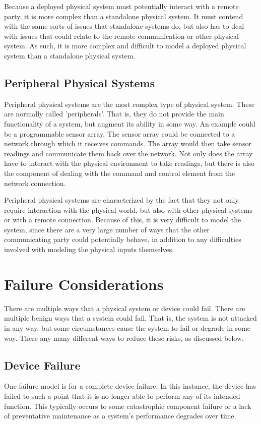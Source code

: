Because a deployed physical system must potentially interact with a remote party, it is more complex than a standalone physical
system. It must contend with the same sorts of issues that standalone systems do, but also has to deal with issues that could
relate to the remote communication or other physical system.  As such, it is more complex and difficult to model a deployed
physical system than a standalone physical system.

\subsection{Peripheral Physical Systems}
Peripheral physical systems are the most complex type of physical system. These are normally called 'peripherals'. That
is, they do not provide the main functionality of a system, but augment its ability in some way. An example could be a 
programmable sensor array. The sensor array could be connected to a network through which it receives commands. The array
would then take sensor readings and communicate them back over the network. Not only does the array have to 
interact with the physical environment to take readings, but there is also the component of dealing with the
command and control element from the network connection.

Peripheral physical systems are characterized by the fact that they not only require interaction with the physical world, but
also with other physical systems or with a remote connection. Because of this, it is very difficult to model the system, since
there are a very large number of ways that the other communicating party could potentially behave, in addition to any difficulties
involved with modeling the physical inputs themselves. 


\section{Failure Considerations}
There are multiple ways that a physical system or device could fail. There are multiple benign ways that a system could
fail. That is, the system is not attacked in any way, but some circumstances cause the system to fail or degrade in some
way. There any many different ways to reduce these risks, as discussed below.


\subsection{Device Failure}
One failure model is for a complete device failure. In this instance, the device has failed to such a point that it is no
longer able to perform any of its intended function. This typically occurs to some catastrophic component failure or a 
lack of preventative maintenance as a system's performance degrades over time.

